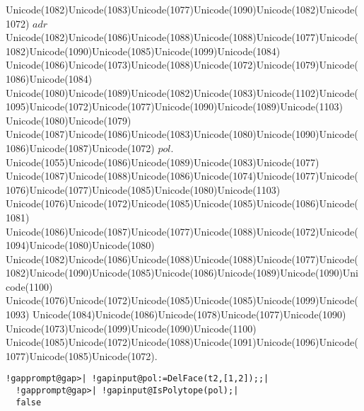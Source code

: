 \documentclass[a4paper,11pt]{report}
\begin{document}
{{{ Unicode(1082)Unicode(1083)Unicode(1077)Unicode(1090)Unicode(1082)Unicode(1072) $adr$ Unicode(1082)Unicode(1086)Unicode(1088)Unicode(1088)Unicode(1077)Unicode(1082)Unicode(1090)Unicode(1085)Unicode(1099)Unicode(1084)
Unicode(1086)Unicode(1073)Unicode(1088)Unicode(1072)Unicode(1079)Unicode(1086)Unicode(1084)
Unicode(1080)Unicode(1089)Unicode(1082)Unicode(1083)Unicode(1102)Unicode(1095)Unicode(1072)Unicode(1077)Unicode(1090)Unicode(1089)Unicode(1103)
Unicode(1080)Unicode(1079)
Unicode(1087)Unicode(1086)Unicode(1083)Unicode(1080)Unicode(1090)Unicode(1086)Unicode(1087)Unicode(1072) $pol.$ Unicode(1055)Unicode(1086)Unicode(1089)Unicode(1083)Unicode(1077)
Unicode(1087)Unicode(1088)Unicode(1086)Unicode(1074)Unicode(1077)Unicode(1076)Unicode(1077)Unicode(1085)Unicode(1080)Unicode(1103)
Unicode(1076)Unicode(1072)Unicode(1085)Unicode(1085)Unicode(1086)Unicode(1081)
Unicode(1086)Unicode(1087)Unicode(1077)Unicode(1088)Unicode(1072)Unicode(1094)Unicode(1080)Unicode(1080)
Unicode(1082)Unicode(1086)Unicode(1088)Unicode(1088)Unicode(1077)Unicode(1082)Unicode(1090)Unicode(1085)Unicode(1086)Unicode(1089)Unicode(1090)Unicode(1100)
Unicode(1076)Unicode(1072)Unicode(1085)Unicode(1085)Unicode(1099)Unicode(1093)
Unicode(1084)Unicode(1086)Unicode(1078)Unicode(1077)Unicode(1090)
Unicode(1073)Unicode(1099)Unicode(1090)Unicode(1100)
Unicode(1085)Unicode(1072)Unicode(1088)Unicode(1091)Unicode(1096)Unicode(1077)Unicode(1085)Unicode(1072). 
\begin{Verbatim}[commandchars=!@|,fontsize=\small,frame=single,label=Пример]
  !gapprompt@gap>| !gapinput@pol:=DelFace(t2,[1,2]);;|
  !gapprompt@gap>| !gapinput@IsPolytope(pol);|
  false
  					

\end{Verbatim}}}}
\end{document}
